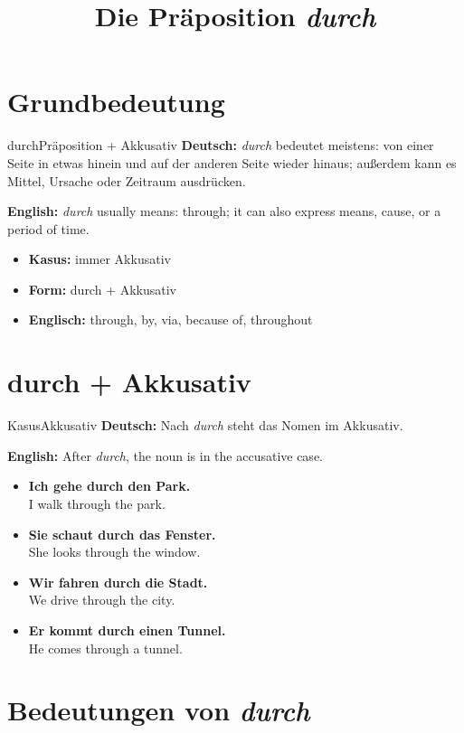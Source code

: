 \documentclass[a4paper,11pt]{article}
\title{Die Präposition \textit{durch}}
\date{}
\newcommand{\GermanText}[1]{\textbf{Deutsch: }#1\par}
\newcommand{\EnglishText}[1]{{\small\color{SoftGray}\textbf{English: }#1\par}}
\newcommand{\ExampleItem}[2]{\item \textbf{#1}\\{\small\color{SoftGray}#2}}
\begin{document}
    \maketitle
    \tableofcontents
    \newpage

\section{Grundbedeutung}

\begin{grammarentry}{durch}{Präposition + Akkusativ}
\GermanText{\textit{durch} bedeutet meistens: von einer Seite in etwas hinein und auf der anderen Seite wieder hinaus; außerdem kann es Mittel, Ursache oder Zeitraum ausdrücken.}
\EnglishText{\textit{durch} usually means: through; it can also express means, cause, or a period of time.}

\begin{itemize}
    \item \textbf{Kasus:} immer Akkusativ
    \item \textbf{Form:} durch + Akkusativ
    \item \textbf{Englisch:} through, by, via, because of, throughout
\end{itemize}
\end{grammarentry}

\section{durch + Akkusativ}

\begin{grammarentry}{Kasus}{Akkusativ}
\GermanText{Nach \textit{durch} steht das Nomen im Akkusativ.}
\EnglishText{After \textit{durch}, the noun is in the accusative case.}

\begin{exbox}
\begin{itemize}
    \ExampleItem{Ich gehe durch den Park.}{I walk through the park.}
    \ExampleItem{Sie schaut durch das Fenster.}{She looks through the window.}
    \ExampleItem{Wir fahren durch die Stadt.}{We drive through the city.}
    \ExampleItem{Er kommt durch einen Tunnel.}{He comes through a tunnel.}
\end{itemize}
\end{exbox}
\end{grammarentry}

\section{Bedeutungen von \textit{durch}}
\end{document}
